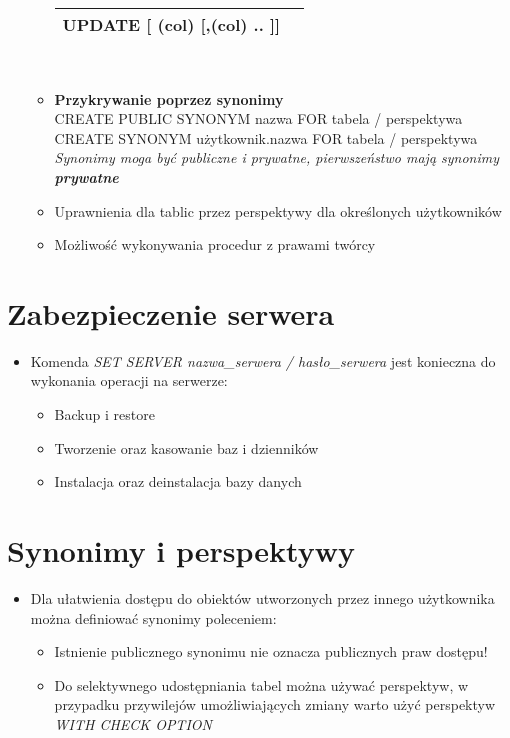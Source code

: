 \documentclass[a4paper,twoside]{article}
\begin{document}
\begin{itemize}
\begin{itemize}
\begin{tabular}{|l|l|}
  				\hline UPDATE [ (col) [,(col) .. ]]\\
  				\hline
  			\end{tabular}\\
  			\item \textbf{Przykrywanie poprzez synonimy}\\
  			CREATE PUBLIC SYNONYM nazwa FOR tabela / perspektywa\\
  			CREATE SYNONYM użytkownik.nazwa FOR tabela / perspektywa\\
  			\emph{Synonimy moga być publiczne i prywatne, pierwszeństwo mają synonimy \textbf{prywatne}}
  			\item Uprawnienia dla tablic przez perspektywy dla określonych użytkowników
  			\item Możliwość wykonywania procedur z prawami twórcy
  		\end{itemize}
  	\end{itemize}
  	
  	\section*{Zabezpieczenie serwera}
  	\begin{itemize}
  		\item Komenda \emph{SET SERVER nazwa\_serwera / hasło\_serwera} jest konieczna do wykonania operacji na serwerze:
  		\begin{itemize}
  			\item Backup i restore 
  			\item Tworzenie oraz kasowanie baz i dzienników 
  			\item Instalacja oraz deinstalacja bazy danych
  		\end{itemize}
  	\end{itemize}
  	
  	\section*{Synonimy i perspektywy}
  	\begin{itemize}
  		\item Dla ułatwienia dostępu do obiektów utworzonych przez innego użytkownika można definiować synonimy poleceniem:
  		\begin{itemize}
  			\item Istnienie publicznego synonimu nie oznacza publicznych praw dostępu! 
  			\item Do selektywnego udostępniania tabel można używać perspektyw, w przypadku przywilejów umożliwiających zmiany warto użyć perspektyw \emph{WITH CHECK OPTION}
  		\end{itemize}
  	\end{itemize}
  	
\end{document}
